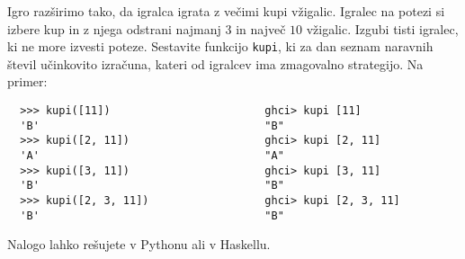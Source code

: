 \documentclass[arhiv]{../izpit}
\begin{document}
\podnaloga 
  Igro razširimo tako, da igralca igrata z večimi kupi vžigalic. Igralec
  na potezi si izbere kup in z njega odstrani najmanj $3$ in največ $10$
  vžigalic. Izgubi tisti igralec, ki ne more izvesti poteze. 
  Sestavite funkcijo \texttt{kupi}, ki za dan seznam naravnih števil
  učinkovito izračuna, kateri od igralcev ima zmagovalno strategijo. Na primer:
  \begin{verbatim}
  >>> kupi([11])                        ghci> kupi [11]
  'B'                                   "B"
  >>> kupi([2, 11])                     ghci> kupi [2, 11]
  'A'                                   "A"
  >>> kupi([3, 11])                     ghci> kupi [3, 11]
  'B'                                   "B"
  >>> kupi([2, 3, 11])                  ghci> kupi [2, 3, 11]
  'B'                                   "B"
  \end{verbatim}
%
Nalogo lahko rešujete v Pythonu ali v Haskellu.
\end{document}
